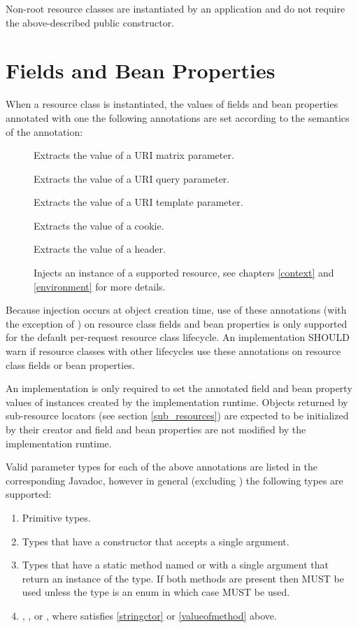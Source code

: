 Non-root resource classes are instantiated by an application and do not require the above-described public constructor.

\section{Fields and Bean Properties}
\label{resource_field}

When a resource class is instantiated, the values of fields and bean properties annotated with one the following annotations are set according to the semantics of the annotation:

\begin{description}
\item[\MatrixParam] Extracts the value of a URI matrix parameter.
\item[\QueryParam] Extracts the value of a URI query parameter.
\item[\PathParam] Extracts the value of a URI template parameter.
\item[\CookieParam] Extracts the value of a cookie.
\item[\HeaderParam] Extracts the value of a header.
\item[\Context] Injects an instance of a supported resource, see chapters \ref{context} and \ref{environment} for more details.
\end{description}

Because injection occurs at object creation time, use of these annotations (with the exception of \Context) on resource class fields and bean properties is only supported for the default per-request resource class lifecycle. An implementation SHOULD warn if resource classes with other lifecycles use these annotations on resource class fields or bean properties.

An implementation is only required to set the annotated field and bean property values of instances created by the implementation runtime. Objects returned by sub-resource locators (see section \ref{sub_resources}) are expected to be initialized by their creator and field and bean properties are not modified by the implementation runtime.

Valid parameter types for each of the above annotations are listed in the corresponding Javadoc, however in general (excluding \Context) the following types are supported:

\begin{enumerate}
\item Primitive types.
\item\label{stringctor} Types that have a constructor that accepts a single  argument.
\item\label{valueofmethod} Types that have a static method named  or  with a single  argument that return an instance of the type. If both methods are present then  MUST be used unless the type is an enum in which case  MUST be used.
\item {}, , or , where  satisfies \ref{stringctor} or \ref{valueofmethod} above.
\end{enumerate}

